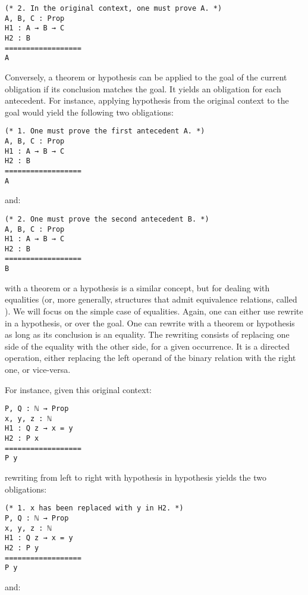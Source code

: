 \begin{verbatim}
(* 2. In the original context, one must prove A. *)
A, B, C : Prop
H1 : A → B → C
H2 : B
==================
A
\end{verbatim}

Conversely, a theorem or hypothesis can be applied to the goal of the current
obligation if its conclusion matches the goal.  It yields an obligation for each
antecedent.  For instance, applying hypothesis  from the original
context to the goal would yield the following two obligations:

\begin{verbatim}
(* 1. One must prove the first antecedent A. *)
A, B, C : Prop
H1 : A → B → C
H2 : B
==================
A
\end{verbatim}

and:

\begin{verbatim}
(* 2. One must prove the second antecedent B. *)
A, B, C : Prop
H1 : A → B → C
H2 : B
==================
B
\end{verbatim}

 with a theorem or a hypothesis is a similar concept, but for
dealing with equalities (or, more generally, structures that admit equivalence
relations, called ).  We will focus on the simple case of
equalities.  Again, one can either use rewrite in a hypothesis, or over the
goal.  One can rewrite with a theorem or hypothesis as long as its conclusion is
an equality.  The rewriting consists of replacing one side of the equality with
the other side, for a given occurrence.  It is a directed operation, either
replacing the left operand of the binary relation with the right one, or
vice-versa.

For instance, given this original context:

\begin{verbatim}
P, Q : ℕ → Prop
x, y, z : ℕ
H1 : Q z → x = y
H2 : P x
==================
P y
\end{verbatim}

rewriting from left to right with hypothesis  in hypothesis
 yields the two obligations:

\begin{verbatim}
(* 1. x has been replaced with y in H2. *)
P, Q : ℕ → Prop
x, y, z : ℕ
H1 : Q z → x = y
H2 : P y
==================
P y
\end{verbatim}

and:

